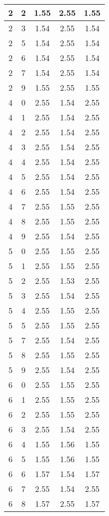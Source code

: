 \begin{longtable}{|c|c||c||c||c|}
	2 & 2 & 1.55 & 2.55 & 1.55 \\ \hline
	2 & 3 & 1.54 & 2.55 & 1.54 \\ \hline
	2 & 5 & 1.54 & 2.55 & 1.54 \\ \hline
	2 & 6 & 1.54 & 2.55 & 1.54 \\ \hline
	2 & 7 & 1.54 & 2.55 & 1.54 \\ \hline
	2 & 9 & 1.55 & 2.55 & 1.55 \\ \hline
	4 & 0 & 2.55 & 1.54 & 2.55 \\ \hline
	4 & 1 & 2.55 & 1.54 & 2.55 \\ \hline
	4 & 2 & 2.55 & 1.54 & 2.55 \\ \hline
	4 & 3 & 2.55 & 1.54 & 2.55 \\ \hline
	4 & 4 & 2.55 & 1.54 & 2.55 \\ \hline
	4 & 5 & 2.55 & 1.54 & 2.55 \\ \hline
	4 & 6 & 2.55 & 1.54 & 2.55 \\ \hline
	4 & 7 & 2.55 & 1.55 & 2.55 \\ \hline
	4 & 8 & 2.55 & 1.55 & 2.55 \\ \hline
	4 & 9 & 2.55 & 1.54 & 2.55 \\ \hline
	5 & 0 & 2.55 & 1.55 & 2.55 \\ \hline
	5 & 1 & 2.55 & 1.55 & 2.55 \\ \hline
	5 & 2 & 2.55 & 1.53 & 2.55 \\ \hline
	5 & 3 & 2.55 & 1.54 & 2.55 \\ \hline
	5 & 4 & 2.55 & 1.55 & 2.55 \\ \hline
	5 & 5 & 2.55 & 1.55 & 2.55 \\ \hline
	5 & 7 & 2.55 & 1.54 & 2.55 \\ \hline
	5 & 8 & 2.55 & 1.55 & 2.55 \\ \hline
	5 & 9 & 2.55 & 1.54 & 2.55 \\ \hline
	6 & 0 & 2.55 & 1.55 & 2.55 \\ \hline
	6 & 1 & 2.55 & 1.55 & 2.55 \\ \hline
	6 & 2 & 2.55 & 1.55 & 2.55 \\ \hline
	6 & 3 & 2.55 & 1.54 & 2.55 \\ \hline
	6 & 4 & 1.55 & 1.56 & 1.55 \\ \hline
	6 & 5 & 1.55 & 1.56 & 1.55 \\ \hline
	6 & 6 & 1.57 & 1.54 & 1.57 \\ \hline
	6 & 7 & 2.55 & 1.54 & 2.55 \\ \hline
	6 & 8 & 1.57 & 2.55 & 1.57 \\ \hline

\end{longtable}
